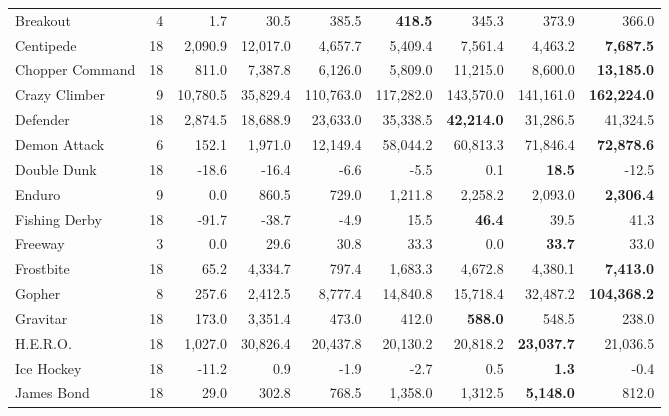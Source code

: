 \begin{table}[!b]
\begin{center}
\begin{tabular}{l|rrr|rrr|rr}
            Breakout &               4 &        1.7 &      30.5 &      385.5 &{\bf418.5}&      345.3 &      373.9 &        366.0 \\
           Centipede &              18 &    2,090.9 &  12,017.0 &    4,657.7 &    5,409.4 &    7,561.4 &    4,463.2 &{\bf7,687.5}\\
     Chopper Command &              18 &      811.0 &   7,387.8 &    6,126.0 &    5,809.0 &   11,215.0 &    8,600.0 &{\bf13,185.0}\\
       Crazy Climber &               9 &   10,780.5 &  35,829.4 &  110,763.0 &  117,282.0 &  143,570.0 &  141,161.0 &{\bf162,224.0}\\
            Defender &              18 &    2,874.5 &  18,688.9 &   23,633.0 &   35,338.5 &{\bf42,214.0}&   31,286.5 &     41,324.5 \\
        Demon Attack &               6 &      152.1 &   1,971.0 &   12,149.4 &   58,044.2 &   60,813.3 &   71,846.4 &{\bf72,878.6}\\
         Double Dunk &              18 &      -18.6 &     -16.4 &       -6.6 &       -5.5 &        0.1 &{\bf18.5}&        -12.5 \\
              Enduro &               9 &        0.0 &     860.5 &      729.0 &    1,211.8 &    2,258.2 &    2,093.0 &{\bf2,306.4}\\
       Fishing Derby &              18 &      -91.7 &     -38.7 &       -4.9 &       15.5 &{\bf46.4}&       39.5 &         41.3 \\
             Freeway &               3 &        0.0 &      29.6 &       30.8 &       33.3 &        0.0 &{\bf33.7}&         33.0 \\
           Frostbite &              18 &       65.2 &   4,334.7 &      797.4 &    1,683.3 &    4,672.8 &    4,380.1 &{\bf7,413.0}\\
              Gopher &               8 &      257.6 &   2,412.5 &    8,777.4 &   14,840.8 &   15,718.4 &   32,487.2 &{\bf104,368.2}\\
            Gravitar &              18 &      173.0 &   3,351.4 &      473.0 &      412.0 &{\bf588.0}&      548.5 &        238.0 \\
            H.E.R.O. &              18 &    1,027.0 &  30,826.4 &   20,437.8 &   20,130.2 &   20,818.2 &{\bf23,037.7}&     21,036.5 \\
          Ice Hockey &              18 &      -11.2 &       0.9 &       -1.9 &       -2.7 &        0.5 &{\bf1.3}&         -0.4 \\
          James Bond &              18 &       29.0 &     302.8 &      768.5 &    1,358.0 &    1,312.5 &{\bf5,148.0}&        812.0 \\

\end{tabular}
\end{center}
\end{table}
